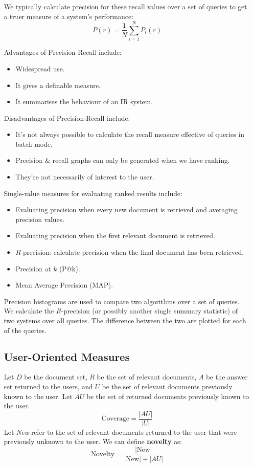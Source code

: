 \documentclass[a4paper,11pt]{article}
\begin{document}
We typically calculate precision for these recall values over a set of queries to get a truer measure of a system's
performance:
$$
P(r) = \frac{1}{N} \sum^N_{i=1}P_i(r)
$$

Advantages of Precision-Recall include:
\begin{itemize}
    \item   Widespread use.
    \item   It gives a definable measure.
    \item   It summarises the behaviour of an IR system.
\end{itemize}

Disadvantages of Precision-Recall include:
\begin{itemize}
    \item   It's not always possible to calculate the recall measure effective of queries in batch mode.
    \item   Precision \& recall graphs can only be generated when we have ranking.
    \item   They're not necessarily of interest to the user.
\end{itemize}

Single-value measures for evaluating ranked results include:
\begin{itemize}
    \item   Evaluating precision when every new document is retrieved and averaging precision values.
    \item   Evaluating precision when the first relevant document is retrieved.
    \item   $R$-precision: calculate precision when the final document has been retrieved.
    \item   Precision at $k$ (P@k).
    \item   Mean Average Precision (MAP).
\end{itemize}

Precision histograms are used to compare two algorithms over a set of queries.
We calculate the $R$-precision (or possibly another single summary statistic) of two systems over all queries.
The difference between the two are plotted for each of the queries.

\subsection{User-Oriented Measures}
Let $D$ be the document set, $R$ be the set of relevant documents, $A$ be the answer set returned to the users, 
and $U$ be the set of relevant documents previously known to the user.
Let $AU$ be the set of returned documents previously known to the user.
$$
\text{Coverage} = \frac{|AU|}{|U|}
$$
Let \textit{New} refer to the set of relevant documents returned to the user that were previously unknown to the user.
We can define \textbf{novelty} as:
$$
\text{Novelty} = \frac{|\text{New}|}{|\text{New}| + |AU|}
$$
\end{document}
